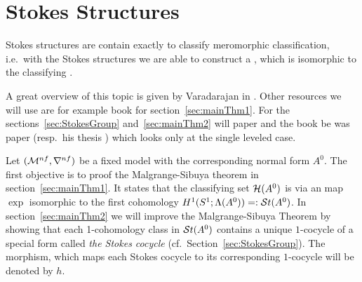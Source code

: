 \chapter{Stokes Structures}\label{chap:stokes}
Stokes structures are contain exactly  to
classify meromorphic classification, i.e.\ with the Stokes structures we are
able to construct a , which is isomorphic to the classifying
.

A great overview of this topic is given by Varadarajan in
\cite{Varadarajan96linearmeromorphic}. Other resources we will use are for
example  book \cite[section II]{sabbah2007isomonodromic} for
section~\ref{sec:mainThm1}.
For the sections~\ref{sec:StokesGroup} and~\ref{sec:mainThm2} will
 paper \cite{Loday1994} and the book \cite{Loday2014}
be  was  paper \cite{boalch}
(resp.\ his thesis \cite{thboalch}) which looks only at the single leveled
case.

Let $(\mathcal{M}^{nf},\nabla^{nf})$ be a fixed model with the corresponding normal
form $A^0$.  The first objective is to proof the Malgrange-Sibuya theorem
in section~\ref{sec:mainThm1}. It states that the classifying set $\mathcal{H}(A^0)$
is via an map $\exp$ isomorphic to the first cohomology
$H^1(S^1;\Lambda(A^0))=:\mathcal{S}{}t(A^0)$.
In section~\ref{sec:mainThm2} we will improve the Malgrange-Sibuya Theorem by
showing that each 1-cohomology class in $\mathcal{S}{}t(A^0)$ contains a unique
$1$-cocycle of a special form called \emph{the Stokes cocycle}
(cf.\ Section~\ref{sec:StokesGroup}).
The morphism, which maps each Stokes cocycle to its corresponding $1$-cocycle
will be denoted by $h$.

